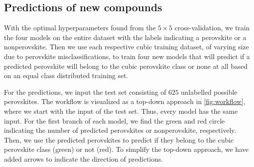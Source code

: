 \begin{table}[!ht]
\centering
\caption{Table with corresponding best estimators during a grid search scheme for predicting cubic perovskites or only perovskites. The test score is here referred to as the mean balanced accuracy score of the models with the same parameters in the cross-validation, and we list all standard deviations in paranthesis.}
\label{tab:cubic-optimal}
\noindent{}
\end{table}


\subsection{Predictions of new compounds}

With the optimal hyperparameters found from the $5\times5$ cross-validation, we train the four models on the entire dataset with the labels indicating a perovskite or a nonperovskite. Then we use each respective cubic training dataset, of varying size due to perovskite misclassifications, to train four new models that will predict if a predicted perovskite will belong to the cubic perovskite class or none at all based on an equal class distributed training set.



For the predictions, we input the test set consisting of $625$ unlabelled possible perovskites. The workflow is visualized as a top-down approach in \autoref{fig:workflow}, where we start with the input of the test set. Thus, every model has the same input. For the first branch of each model, we find the green and red circle indicating the number of predicted perovskites or nonperovskite, respectively. Then, we use the predicted perovskites to predict if they belong to the cubic perovskite class (green) or not (red). To simplify the top-down approach, we have added arrows to indicate the direction of predictions.

